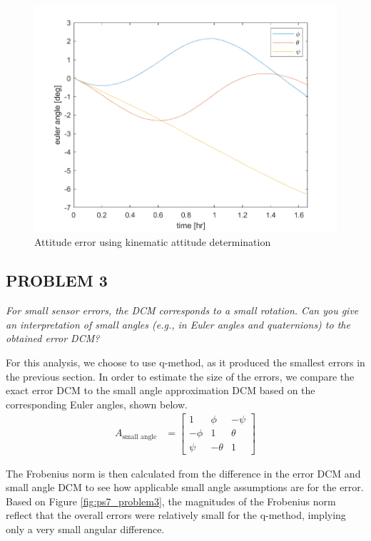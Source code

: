 \begin{figure}[H]
\centering
\includegraphics[scale=0.6]{Images/ps7_problem2_kin.png}
\caption{Attitude error using kinematic attitude determination}
\label{fig:ps7_problem2_kin}
\end{figure}

\subsection{PROBLEM 3}
\textit{For small sensor errors, the DCM corresponds to a small rotation. Can you give an interpretation of small angles (e.g., in Euler angles and quaternions) to the obtained error DCM?}

For this analysis, we choose to use q-method, as it produced the smallest errors in the previous section. In order to estimate the size of the errors, we compare the exact error DCM to the small angle approximation DCM based on the corresponding Euler angles, shown below.
\begin{align*}
    A_{\text{small angle}} &= 
    \begin{bmatrix}
        1 & \phi & -\psi \\
        -\phi & 1 & \theta \\
        \psi & -\theta & 1
    \end{bmatrix}
\end{align*}

The Frobenius norm is then calculated from the difference in the error DCM and small angle DCM to see how applicable small angle assumptions are for the error. Based on Figure \ref{fig:ps7_problem3}, the magnitudes of the Frobenius norm reflect that the overall errors were relatively small for the q-method, implying only a very small angular difference.

